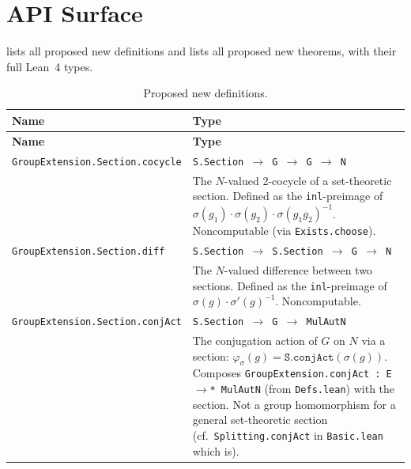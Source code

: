 \documentclass[11pt]{article}
\begin{document}
\section{API Surface}\label{sec:api}

 lists all proposed new definitions and  lists
all proposed new theorems, with their full Lean~4 types.

\begin{longtable}{p{4.8cm}p{8.5cm}}
\caption{Proposed new definitions.}\label{tab:api-defs} \\
\toprule
\textbf{Name} & \textbf{Type} \\
\midrule
\endfirsthead
\toprule
\textbf{Name} & \textbf{Type} \\
\midrule
\endhead
\texttt{GroupExtension.\allowbreak Section.cocycle}
  & \texttt{S.Section $\to$ G $\to$ G $\to$ N} \\[4pt]
  & \small The $N$-valued 2-cocycle of a set-theoretic section. Defined as the
    \texttt{inl}-preimage of $\sigma(g_1) \cdot \sigma(g_2) \cdot \sigma(g_1 g_2)^{-1}$.
    Noncomputable (via \texttt{Exists.choose}). \\[6pt]

\texttt{GroupExtension.\allowbreak Section.diff}
  & \texttt{S.Section $\to$ S.Section $\to$ G $\to$ N} \\[4pt]
  & \small The $N$-valued difference between two sections. Defined as the
    \texttt{inl}-preimage of $\sigma(g) \cdot \sigma'(g)^{-1}$. Noncomputable. \\[6pt]

\texttt{GroupExtension.\allowbreak Section.conjAct}
  & \texttt{S.Section $\to$ G $\to$ \texttt{MulAut}\;N} \\[4pt]
  & \small The conjugation action of $G$ on $N$ via a section: $\varphi_\sigma(g) =
    \texttt{S.conjAct}(\sigma(g))$. Composes
    \texttt{GroupExtension.conjAct : E $\to$* MulAut\;N} (from \texttt{Defs.lean})
    with the section. Not a group homomorphism for a general set-theoretic section
    (cf.\ \texttt{Splitting.conjAct} in \texttt{Basic.lean} which is). \\
\bottomrule
\end{longtable}
\end{document}
